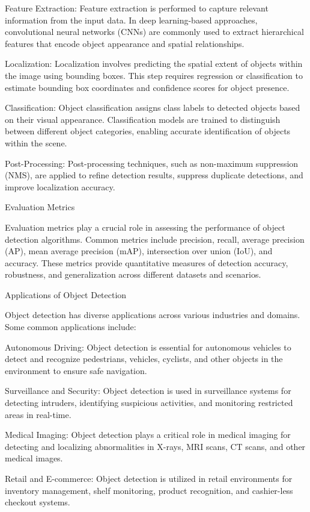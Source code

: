 Feature Extraction: Feature extraction is performed to capture relevant information from the input data. In deep learning-based approaches, convolutional neural networks (CNNs) are commonly used to extract hierarchical features that encode object appearance and spatial relationships.

Localization: Localization involves predicting the spatial extent of objects within the image using bounding boxes. This step requires regression or classification to estimate bounding box coordinates and confidence scores for object presence.

Classification: Object classification assigns class labels to detected objects based on their visual appearance. Classification models are trained to distinguish between different object categories, enabling accurate identification of objects within the scene.

Post-Processing: Post-processing techniques, such as non-maximum suppression (NMS), are applied to refine detection results, suppress duplicate detections, and improve localization accuracy.

Evaluation Metrics

Evaluation metrics play a crucial role in assessing the performance of object detection algorithms. Common metrics include precision, recall, average precision (AP), mean average precision (mAP), intersection over union (IoU), and accuracy. These metrics provide quantitative measures of detection accuracy, robustness, and generalization across different datasets and scenarios.

Applications of Object Detection

Object detection has diverse applications across various industries and domains. Some common applications include:

Autonomous Driving: Object detection is essential for autonomous vehicles to detect and recognize pedestrians, vehicles, cyclists, and other objects in the environment to ensure safe navigation.

Surveillance and Security: Object detection is used in surveillance systems for detecting intruders, identifying suspicious activities, and monitoring restricted areas in real-time.

Medical Imaging: Object detection plays a critical role in medical imaging for detecting and localizing abnormalities in X-rays, MRI scans, CT scans, and other medical images.

Retail and E-commerce: Object detection is utilized in retail environments for inventory management, shelf monitoring, product recognition, and cashier-less checkout systems.

